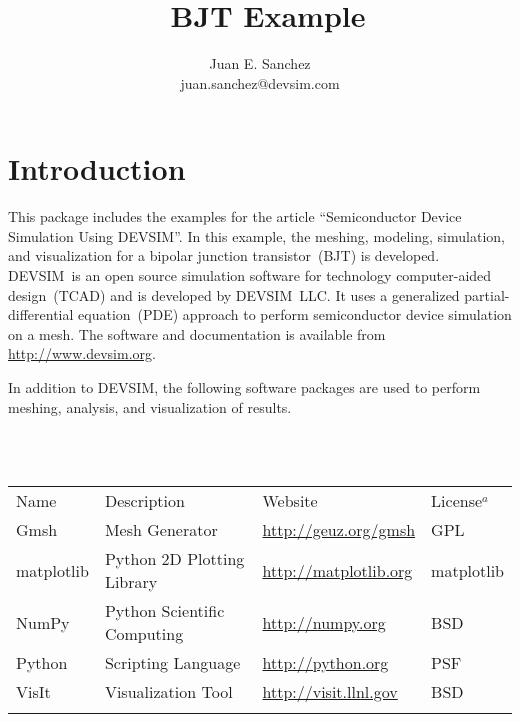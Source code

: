 \documentclass[11pt]{article}
\title{\devsim\ BJT Example}
\author{Juan E. Sanchez\\ juan.sanchez@devsim.com}
\newcommand{\devsim}{\mbox{DEVSIM}}
\newcommand{\devsimllc}{\mbox{DEVSIM LLC}}
\newcommand{\gmsh}{\mbox{Gmsh}}
\newcommand{\matplotlib}{\mbox{matplotlib}}
\newcommand{\numpy}{\mbox{NumPy}}
\newcommand{\python}{\mbox{Python}}
\newcommand{\visit}{\mbox{VisIt}}
\begin{document}
\maketitle
\thispagestyle{empty}
\section{Introduction}
This package includes the examples for the article ``Semiconductor Device Simulation Using \devsim''.  In this example, the meshing, modeling, simulation, and visualization for a bipolar junction transistor~(BJT) is developed.
\devsim\ is an open source simulation software for technology computer-aided design~(TCAD) and is developed by \devsimllc.  It uses a generalized partial-differential equation~(PDE) approach to perform semiconductor device simulation on a mesh.  The software and documentation is available from \url{http://www.devsim.org}.

In addition to \devsim, the following software packages are used to perform meshing, analysis, and visualization of results.

~\\~\\
\noindent
\begin{tabular}{p{1.5cm}p{5cm}p{5cm}p{2cm}}
\hline\noalign{\smallskip}
Name & Description & Website & License$^a$  \\
\gmsh & Mesh Generator & \url{http://geuz.org/gmsh} & GPL\\
\matplotlib &  Python 2D Plotting Library & \url{http://matplotlib.org} & \matplotlib \\
\numpy &  Python Scientific Computing & \url{http://numpy.org} & BSD\\
\python &  Scripting Language & \url{http://python.org} & PSF\\
\visit &  Visualization Tool & \url{http://visit.llnl.gov} & BSD\\
\noalign{\smallskip}\hline\noalign{\smallskip}
\end{tabular}
\end{document}
